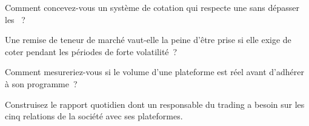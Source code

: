 \begin{interviewq}\label{iq:m3:getting-access-crypto-venues:3}
Comment concevez-vous un système de cotation qui respecte une  sans dépasser les ~?
\end{interviewq}

\begin{interviewq}\label{iq:m3:getting-access-crypto-venues:4}
Une remise de teneur de marché vaut-elle la peine d'être prise si elle exige de coter pendant les périodes de forte volatilité~?
\end{interviewq}

\begin{interviewq}\label{iq:m3:getting-access-crypto-venues:5}
Comment mesureriez-vous si le volume d'une plateforme est réel avant d'adhérer à son programme~?
\end{interviewq}

\begin{interviewq}\label{iq:m3:getting-access-crypto-venues:6}
Construisez le rapport quotidien dont un responsable du trading a besoin sur les cinq relations de la société avec ses plateformes.
\end{interviewq}
